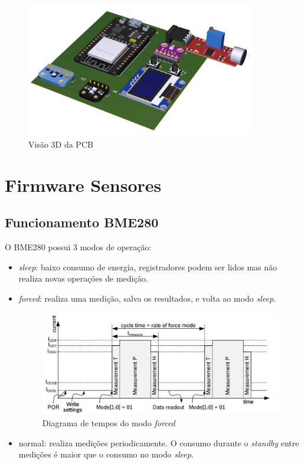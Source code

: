 \documentclass[../monografia.tex]{subfiles}
\begin{document}
\begin{figure}[h!]
\centering
\includegraphics[width=10cm]{pcb}
\caption{Visão 3D da PCB}
\label{fig:img4}
\end{figure}


\section{Firmware Sensores}
\subsection{Funcionamento BME280}

O BME280 possui 3 modos de operação: \cite{bme280}
\begin{itemize}
	\item \textit{sleep}: baixo consumo de energia, registradores podem ser lidos mas não realiza novas operações de medição.
	\item \textit{forced}: realiza uma medição, salva os resultados, e volta ao modo \textit{sleep}.
	
	\begin{figure}[h]
		\centering
		\includegraphics[width=12cm]{timing_bme280}
		\caption{Diagrama de tempos do modo \textit{forced}}
		\label{fig:time_bme280}
	\end{figure}

	\item normal: realiza medições periodicamente. O consumo durante o \textit{standby} entre medições é maior que o consumo no modo \textit{sleep}. 
\end{itemize}
\end{document}
